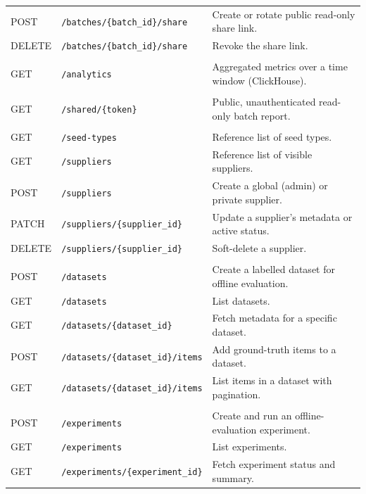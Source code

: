 \begin{singlespace}
\begin{longtable}{@{}l l p{6.4cm}@{}}
POST   & \texttt{/batches/\{batch\_id\}/share}    & Create or rotate public read-only share link. \\
DELETE & \texttt{/batches/\{batch\_id\}/share}    & Revoke the share link. \\
\addlinespace
\multicolumn{3}{@{}l}{\textbf{analytics}}\\
GET    & \texttt{/analytics}            & Aggregated metrics over a time window (ClickHouse). \\
\addlinespace
\multicolumn{3}{@{}l}{\textbf{shared}}\\
GET    & \texttt{/shared/\{token\}}     & Public, unauthenticated read-only batch report. \\
\addlinespace
\multicolumn{3}{@{}l}{\textbf{catalog}}\\
GET    & \texttt{/seed-types}           & Reference list of seed types. \\
GET    & \texttt{/suppliers}            & Reference list of visible suppliers. \\
POST   & \texttt{/suppliers}            & Create a global (admin) or private supplier. \\
PATCH  & \texttt{/suppliers/\{supplier\_id\}} & Update a supplier's metadata or active status. \\
DELETE & \texttt{/suppliers/\{supplier\_id\}} & Soft-delete a supplier. \\
\addlinespace
\multicolumn{3}{@{}l}{\textbf{datasets}}\\
POST   & \texttt{/datasets}                 & Create a labelled dataset for offline evaluation. \\
GET    & \texttt{/datasets}                 & List datasets. \\
GET    & \texttt{/datasets/\{dataset\_id\}} & Fetch metadata for a specific dataset. \\
POST   & \texttt{/datasets/\{dataset\_id\}/items} & Add ground-truth items to a dataset. \\
GET    & \texttt{/datasets/\{dataset\_id\}/items} & List items in a dataset with pagination. \\
\addlinespace
\multicolumn{3}{@{}l}{\textbf{experiments}}\\
POST   & \texttt{/experiments}              & Create and run an offline-evaluation experiment. \\
GET    & \texttt{/experiments}              & List experiments. \\
GET    & \texttt{/experiments/\{experiment\_id\}} & Fetch experiment status and summary. \\

\end{longtable}
\end{singlespace}


